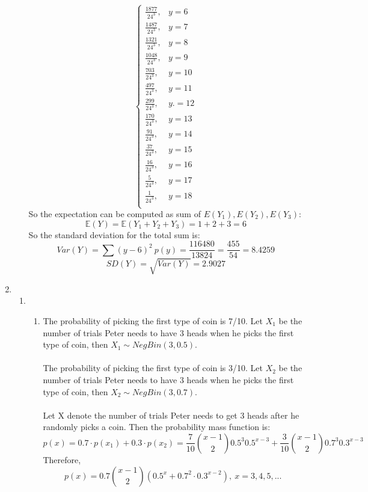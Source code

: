 \documentclass[11pt]{article}
\begin{document}
\begin{enumerate}[label=\textbf{Question \arabic*:},start=1]
\begin{enumerate}
\[\begin{cases}
        \frac{1877}{24^3}, & y = 6\\
        \frac{1487}{24^3}, & y = 7\\
        \frac{1321}{24^3}, & y = 8\\
        \frac{1048}{24^3}, & y = 9\\
        \frac{703}{24^3}, & y = 10\\
        \frac{497}{24^3}, & y = 11\\
        \frac{299}{24^3}, & y. = 12\\
        \frac{170}{24^3}, & y = 13\\
        \frac{91}{24^3}, & y = 14\\
        \frac{37}{24^3}, & y = 15\\
        \frac{16}{24^3}, & y = 16\\
        \frac{5}{24^3}, & y = 17\\
        \frac{1}{24^3}, & y = 18\\
        \end{cases}
\]
So the expectation can be computed as sum of \( E(Y_1), E(Y_2), E(Y_3) \):
\[
\mathbb{E}(Y) = \mathbb{E}(Y_1 + Y_2 + Y_3) = 1 + 2 + 3 = 6
\]
So the standard deviation for the total sum is:
\[
Var(Y) = \sum (y-6)^2\ p(y) = \frac{116480}{13824} = \frac{455}{54} = 8.4259
\]
\[
SD(Y) = \sqrt{Var(Y)} = 2.9027
\] 
\end{enumerate}



\item
\begin{enumerate}
  \item 
  \begin{enumerate}
    \item The probability of picking the first type of coin is 7/10. Let \( X_1 \) be the number of trials Peter needs to have 3 heads when he picks the first type of coin, then \( X_1 \sim NegBin(3, 0.5) \). \\
    \\
    The probability of picking the first type of coin is 3/10. Let \( X_2 \) be the number of trials Peter needs to have 3 heads when he picks the first type of coin, then \( X_2 \sim NegBin(3, 0.7) \). \\
    \\
    Let X denote the number of trials Peter needs to get 3 heads after he randomly picks a coin. Then the probability mass function is:
\[
p(x) = 0.7 \cdot p(x_1) + 0.3 \cdot p(x_2) =\frac{7}{10} {x-1 \choose 2} 0.5^3 0.5^{x-3} + \frac{3}{10} {x-1 \choose 2} 0.7^3 0.3^{x-3} 
\]
Therefore,
\[
p(x) = 0.7{x-1 \choose 2}(0.5^x + 0.7^2 \cdot 0.3^{x-2}), \ x = 3, 4, 5, ...
\]



\end{enumerate}
\end{enumerate}
\end{enumerate}
\end{document}
